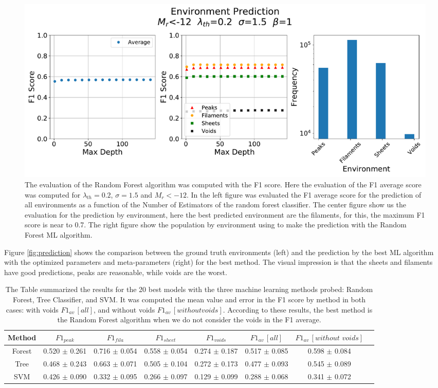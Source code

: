 \documentclass[usenatbib]{mnras}
\begin{document}
\begin{figure}
    \includegraphics[scale=0.43]{Figs/p_F1_curve_Forest.pdf}
    \caption{The evaluation of the Random Forest algorithm was computed with the F1 score. Here the evaluation of the F1 average score  was computed for $\lambda_{th}=0.2$, $\sigma=1.5$ and $M_r<-12$.  In the left figure was evaluated the F1 average score for the prediction of all environments as a function of the Number of Estimators of the random forest classifier. The center figure show us the evaluation for the prediction by environment, here the best predicted environment are the filaments, for this, the maximum F1 score is near to 0.7. The right figure show the population by environment using to make the prediction with the Random Forest ML algorithm.}
    \label{fig:F1_curve}
\end{figure}


Figure \ref{fig:prediction} shows the comparison between the ground truth environments (left) and the prediction by the best ML algorithm with the optimized parameters and meta-parameters (right) for the best method.
The visual impression is that the sheets and filaments have good predictions,
peaks are reasonable, while voids are the worst.

\begin{table}
\centering
\begin{tabular}{cccccccc}
\hline
 Method   & $F1_{peak}$     & $F1_{fila}$     & $F1_{sheet}$    & $F1_{voids}$    & $F1_{av}\,[all]$   & $F1_{av}\,[without \,\,voids]$   \\
\hline
 Forest   & 0.520 $\pm$ 0.261  & 0.716 $\pm$ 0.054 & 0.558 $\pm$ 0.054 & 0.274 $\pm$ 0.187 & 0.517 $\pm$ 0.085  & 0.598 $\pm$ 0.084 \\
 Tree     & 0.468 $\pm$ 0.243 & 0.663 $\pm$ 0.071 & 0.505 $\pm$ 0.104 & 0.272 $\pm$ 0.173 & 0.477 $\pm$ 0.093 & 0.545 $\pm$ 0.089  \\
 SVM      & 0.426 $\pm$ 0.090  & 0.332 $\pm$ 0.095 & 0.266 $\pm$ 0.097 & 0.129 $\pm$ 0.099 & 0.288 $\pm$ 0.068 & 0.341 $\pm$ 0.072   \\
\hline
\end{tabular}
\caption{The Table summarized the results for the 20 best models with the three machine learning methods probed: Random Forest, Tree Classifier, and SVM. It was computed the mean value and error in the F1 score by method in both cases: with voids $F1_{av}\,[all]$, and without voids $F1_{av}\,[without voids]$. According to these results, the best method is the Random Forest algorithm when we do not consider the voids in the F1 average.}
\label{tab:methods}
\end{table}
\end{document}
